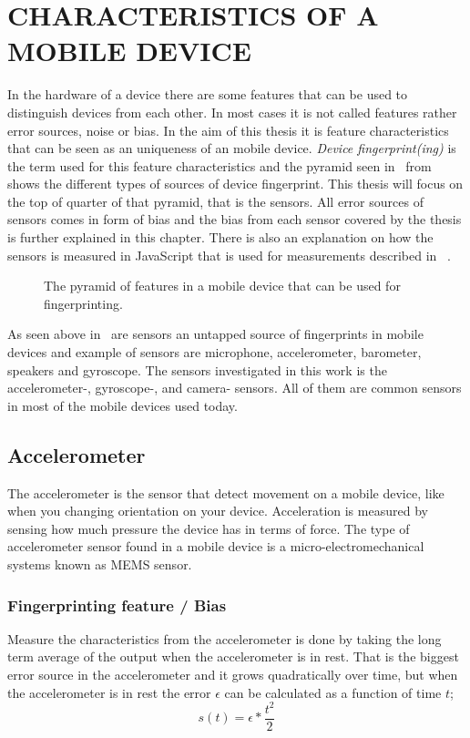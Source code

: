\chapter{CHARACTERISTICS OF A MOBILE DEVICE} \label{cha:character}
In the hardware of a device there are some features that can be used to distinguish devices from each other. In most cases it is not called features rather error sources, noise or bias. In the aim of this thesis it is feature characteristics that can be seen as an uniqueness of an mobile device. \textit{Device fingerprint(ing)} is the term used for this feature characteristics and the pyramid seen in~ from ~\cite[]{sensor:acoustic} shows the different types of sources of device fingerprint. This thesis will focus on the top of quarter of that pyramid, that is the sensors. All error sources of sensors comes in form of bias and the bias from each sensor covered by the thesis is further explained in this chapter. There is also an explanation on how the sensors is measured in JavaScript that is used for measurements described in ~.

\begin{figure}[!h]
	
	\caption{\label{fig:pyramid} The pyramid of features in a mobile device that can be used for fingerprinting.\cite[]{sensor:acoustic}}
\end{figure}

As seen above in~ are sensors an untapped source of fingerprints in mobile devices and example of sensors are microphone, accelerometer, barometer, speakers and gyroscope. The sensors investigated in this work is the accelerometer-, gyroscope-, and camera- sensors. All of them are common sensors in most of the mobile devices used today.


\section{Accelerometer}\label{sec:accelerometer}
The accelerometer is the sensor that detect movement on a mobile device, like when you changing orientation on your device. Acceleration is measured by sensing how much pressure the device has in terms of force. The type of accelerometer sensor found in a mobile device is a micro-electromechanical systems known as MEMS sensor. \cite[]{sensors:fusion}
\subsection{Fingerprinting feature / Bias}
Measure the characteristics from the accelerometer is done by taking the long term average of the output when the accelerometer is in rest. That is the biggest error source in the accelerometer and it grows quadratically over time, but when the accelerometer is in rest the error $\epsilon$ can be calculated as a function of time $t$;
\begin{equation} \label{eq:AccBias}
s(t)=\epsilon * \frac{t^2}{2} 
\end{equation}
\cite[]{sensor:inertialNav}\cite[]{sensors:fusion}


